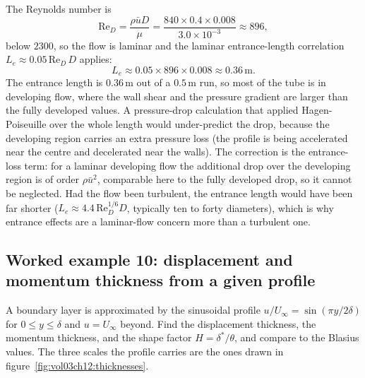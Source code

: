 The Reynolds number is
\[
\text{Re}_D = \frac{\rho\bar u D}{\mu} = \frac{840\times0.4\times
0.008}{3.0\times10^{-3}} \approx 896,
\]
below $2300$, so the flow is laminar and the laminar entrance-length
correlation $L_e \approx 0.05\,\text{Re}_D\,D$ applies:
\[
L_e \approx 0.05\times896\times0.008 \approx 0.36\,\si{\meter}.
\]
The entrance length is $0.36\,\si{\meter}$ out of a $0.5\,\si{\meter}$
run, so most of the tube is in developing flow, where the wall shear
and the pressure gradient are larger than the fully developed values.
A pressure-drop calculation that applied Hagen-Poiseuille over the
whole length would under-predict the drop, because the developing
region carries an extra pressure loss (the profile is being
accelerated near the centre and decelerated near the walls). The
correction is the entrance-loss term: for a laminar developing flow
the additional drop over the developing region is of order
$\rho\bar u^2$, comparable here to the fully developed drop, so it
cannot be neglected. Had the flow been turbulent, the entrance length
would have been far shorter ($L_e\approx4.4\,\text{Re}_D^{1/6}D$,
typically ten to forty diameters), which is why entrance effects are
a laminar-flow concern more than a turbulent one.

\subsection*{Worked example 10: displacement and momentum thickness from a given profile}

A boundary layer is approximated by the sinusoidal profile
$u/U_\infty = \sin(\pi y/2\delta)$ for $0\le y\le\delta$ and
$u = U_\infty$ beyond. Find the displacement thickness, the momentum
thickness, and the shape factor $H = \delta^*/\theta$, and compare to
the Blasius values. The three scales the profile carries are the ones
drawn in figure~\ref{fig:vol03ch12:thicknesses}.

